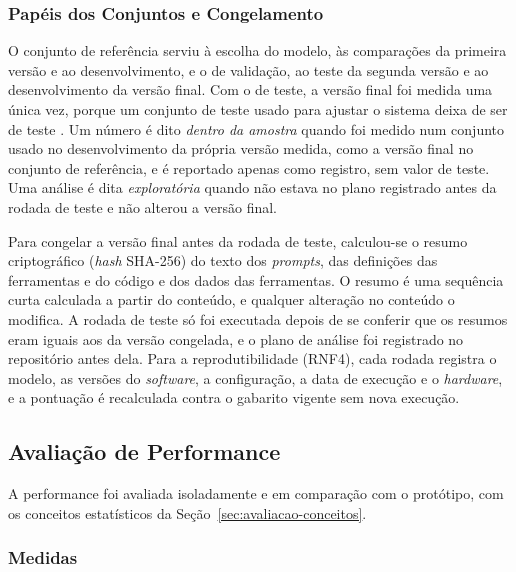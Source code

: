 \subsubsection{Papéis dos Conjuntos e Congelamento}
\label{sec:papeis}

O conjunto de referência serviu à escolha do modelo, às comparações da primeira versão e ao desenvolvimento, e o de validação, ao teste da segunda versão e ao desenvolvimento da versão final. Com o de teste, a versão final foi medida uma única vez, porque um conjunto de teste usado para ajustar o sistema deixa de ser de teste \cite{dwork2015reusable}. Um número é dito \emph{dentro da amostra} quando foi medido num conjunto usado no desenvolvimento da própria versão medida, como a versão final no conjunto de referência, e é reportado apenas como registro, sem valor de teste. Uma análise é dita \emph{exploratória} quando não estava no plano registrado antes da rodada de teste e não alterou a versão final.

Para congelar a versão final antes da rodada de teste, calculou-se o resumo criptográfico (\textit{hash} SHA-256) do texto dos \textit{prompts}, das definições das ferramentas e do código e dos dados das ferramentas. O resumo é uma sequência curta calculada a partir do conteúdo, e qualquer alteração no conteúdo o modifica. A rodada de teste só foi executada depois de se conferir que os resumos eram iguais aos da versão congelada, e o plano de análise foi registrado no repositório antes dela. Para a reprodutibilidade (RNF4), cada rodada registra o modelo, as versões do \textit{software}, a configuração, a data de execução e o \textit{hardware}, e a pontuação é recalculada contra o gabarito vigente sem nova execução.

\subsection{Avaliação de Performance}
\label{sec:avaliacao}

A performance foi avaliada isoladamente e em comparação com o protótipo, com os conceitos estatísticos da Seção~\ref{sec:avaliacao-conceitos}.

\subsubsection{Medidas}
\label{sec:medidas}

